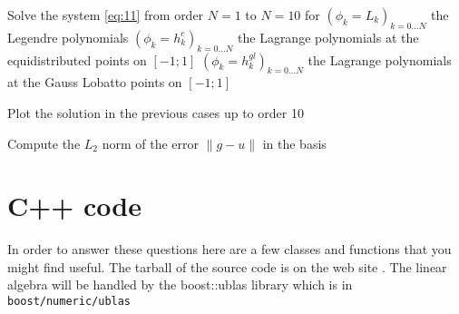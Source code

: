 \documentclass{article}
\begin{document}
\begin{Answer}[title={p type Galerkin method in 1D}]
  \Question Solve the system \eqref{eq:11} from order $N=1$ to $N=10$ for
  \subQuestion $(\phi_k = L_k)_{k=0...N}$ the Legendre polynomials
  \subQuestion $(\phi_k = h^{e}_k)_{k=0...N}$ the Lagrange polynomials at the equidistributed points on $[-1;1]$
  \subQuestion $(\phi_k = h^{gl}_k)_{k=0...N}$ the Lagrange polynomials at the Gauss Lobatto points on $[-1;1]$

  \Question Plot the solution in the previous cases up to order 10
   
  \Question Compute the $L_2$ norm of the error $\|g-u\|$ in the basis
\end{Answer}



\appendix

\section{C++ code}

In order to answer these questions here are a few classes and
functions that you might find useful.  The tarball of the source code
is on the web site \url{}. The linear algebra will be handled by the
boost::ublas library which is in \verb+boost/numeric/ublas+







\end{document}
